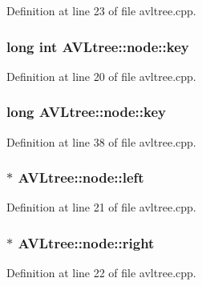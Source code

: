 Definition at line 23 of file avltree.\-cpp.

\hypertarget{struct_a_v_ltree_1_1node_a773a32aca2eecc03384239236f5bb6bf}{
\subsubsection[{key}]{\setlength{\rightskip}{0pt plus 5cm}long int A\-V\-Ltree\-::node\-::key}}\label{struct_a_v_ltree_1_1node_a773a32aca2eecc03384239236f5bb6bf}


Definition at line 20 of file avltree.\-cpp.

\hypertarget{struct_a_v_ltree_1_1node_af9249c77ccf64046f71f61ec7e9cf3f4}{
\subsubsection[{key}]{\setlength{\rightskip}{0pt plus 5cm}long A\-V\-Ltree\-::node\-::key}}\label{struct_a_v_ltree_1_1node_af9249c77ccf64046f71f61ec7e9cf3f4}


Definition at line 38 of file avltree.\-cpp.

\hypertarget{struct_a_v_ltree_1_1node_ab7fd8235f42249a50639628375c9fc53}{
\subsubsection[{left}]{ $\ast$ A\-V\-Ltree\-::node\-::left}}\label{struct_a_v_ltree_1_1node_ab7fd8235f42249a50639628375c9fc53}


Definition at line 21 of file avltree.\-cpp.

\hypertarget{struct_a_v_ltree_1_1node_ab0c7985a54e707daeca69540e281c715}{
\subsubsection[{right}]{ $\ast$ A\-V\-Ltree\-::node\-::right}}\label{struct_a_v_ltree_1_1node_ab0c7985a54e707daeca69540e281c715}


Definition at line 22 of file avltree.\-cpp.

